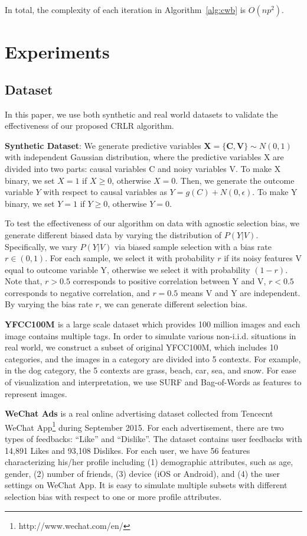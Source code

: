 \documentclass[sigconf]{acmart}
\begin{document}
In total, the complexity of each iteration in Algorithm~\ref{alg:cwb} is $O(np^2)$.

\section{Experiments}\subsection{Dataset}
In this paper, we use both synthetic and real world datasets to validate the effectiveness of our proposed CRLR algorithm.

\textbf{Synthetic Dataset}: We generate predictive variables $\mathbf{X} = \{\mathbf{C},\mathbf{V}\} \sim N(0,1)$ with independent Gaussian distribution, where the predictive variables X are divided into two parts: causal variables C and noisy variables V. 
To make X binary, we set $X = 1$ if $X \geq 0$, otherwise $X = 0$.
Then, we generate the outcome variable $Y$ with respect to causal variables as $Y = g(C)+N(0,\epsilon)$.
To make Y binary, we set $Y = 1$ if $Y \geq 0$, otherwise $Y = 0$.

To test the effectiveness of our algorithm on data with agnostic selection bias, we generate different biased data by varying the distribution of $P(Y|V)$. 
Specifically, we vary $P(Y|V)$ via biased sample selection with a bias rate $r\in(0,1)$. 
For each sample, we select it with probability $r$ if its noisy features V equal to outcome variable Y, otherwise we select it with probability $(1-r)$. 
Note that, $r > 0.5$ corresponds to positive correlation between Y and V, $r < 0.5$ corresponds to negative correlation, and $r = 0.5$ means V and Y are independent. 
By varying the bias rate $r$, we can generate different selection bias.

\textbf{YFCC100M \cite{thomee2016yfcc100m}} is a large scale dataset which provides 100 million images and each image contains multiple tags.
In order to simulate various non-i.i.d. situations in real world, we construct a subset of original YFCC100M, which includes 10 categories, and the images in a category are divided into 5 contexts. 
For example, in the dog category, the 5 contexts are grass, beach, car, sea, and snow.
For ease of visualization and interpretation, we use SURF \cite{bay2006surf} and Bag-of-Words \cite{csurka2004visual} as features to represent images.

\textbf{WeChat Ads} is a real online advertising dataset collected from Tencecnt WeChat App\footnote{http://www.wechat.com/en/} during September 2015.
For each advertisement, there are two types of feedbacks: “Like” and “Dislike”.  
The dataset contains user feedbacks with 14,891 Likes and 93,108 Dislikes. 
For each user, we have 56 features characterizing his/her profile including (1) demographic attributes, such as age, gender, (2) number of friends, (3) device (iOS or Android), and (4) the user settings on WeChat App.
It is easy to simulate multiple subsets with different selection bias with respect to one or more profile attributes.
\end{document}
